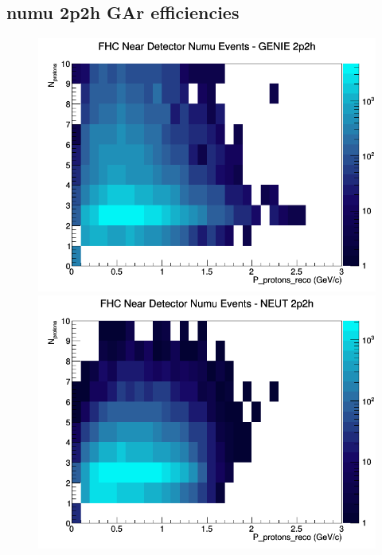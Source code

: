 \documentclass[12pt]{article}
\begin{document}
\subsection{numu 2p2h GAr efficiencies}
\begin{figure}[h]
\includegraphics[width=\linewidth]{eff_N_P/GAr/protons/2p2h_FHC_ND_numu_N_P_GENIE.png}
\endminipage
{}
\includegraphics[width=\linewidth]{eff_N_P/GAr/protons/2p2h_FHC_ND_numu_N_P_NEUT.png}
\endminipage
{}

\end{figure}
\end{document}

